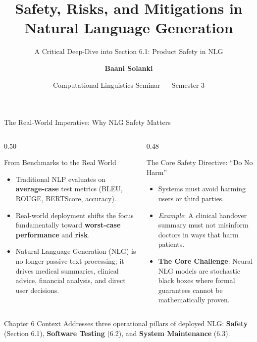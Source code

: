 \documentclass[aspectratio=169, 10pt]{beamer}
\title[Safety in NLG Systems]{\textbf{Safety, Risks, and Mitigations in Natural Language Generation}}
\subtitle{A Critical Deep-Dive into Section 6.1: Product Safety in NLG}
\author[Baani Solanki]{\textbf{Baani Solanki}}
\institute[IIIT Hyderabad]{
  Department of Computer Science / Computational Linguistics\\
  International Institute of Information Technology, Hyderabad
}
\date{Computational Linguistics Seminar --- Semester 3}
\begin{document}
\begin{frame}[plain]
  \titlepage
\end{frame}

\begin{frame}{The Real-World Imperative: Why NLG Safety Matters}
  \begin{columns}[T]
    \begin{column}{0.50\textwidth}
      \begin{block}{From Benchmarks to the Real World}
        \begin{itemize}
          \item Traditional NLP evaluates on \textbf{average-case} test metrics (BLEU, ROUGE, BERTScore, accuracy).
          \item Real-world deployment shifts the focus fundamentally toward \textbf{worst-case performance} and \textbf{risk}.
          \item Natural Language Generation (NLG) is no longer passive text processing; it drives medical summaries, clinical advice, financial analysis, and direct user decisions.
        \end{itemize}
      \end{block}
    \end{column}

    \begin{column}{0.48\textwidth}
      \begin{alertbox}{The Core Safety Directive: ``Do No Harm''}
        \begin{itemize}
          \item Systems must avoid harming users or third parties.
          \item \textit{Example}: A clinical handover summary must not misinform doctors in ways that harm patients.
          \item \textbf{The Core Challenge}: Neural NLG models are stochastic black boxes where formal guarantees cannot be mathematically proven.
        \end{itemize}
      \end{alertbox}
    \end{column}
  \end{columns}

  \vskip 3mm
  \begin{exampleblock}{Chapter 6 Context}
    Addresses three operational pillars of deployed NLG: \textbf{Safety} (Section 6.1), \textbf{Software Testing} (6.2), and \textbf{System Maintenance} (6.3).
  \end{exampleblock}
\end{frame}
\end{document}
